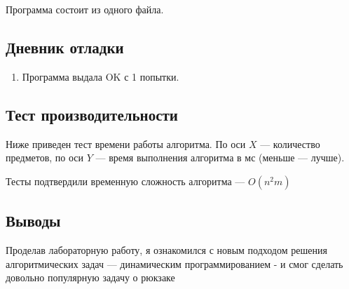 \documentclass[12pt]{article}
\begin{document}
Программа состоит из одного файла.


\newpage
\subsection*{Дневник отладки}

\begin{enumerate}
    \item Программа выдала {OK} с 1 попытки.
\end{enumerate}

\newpage
\subsection*{Тест производительности}

    Ниже приведен тест времени работы алгоритма. По оси $X$ — количество 
    предметов, по оси $Y$ — время выполнения алгоритма в мс (меньше — лучше).
    

    Тесты подтвердили временную сложность алгоритма — $O(n^2m)$



\newpage
\subsection*{Выводы}

Проделав лабораторную работу, я ознакомился с новым подходом решения 
алгоритмических задач — динамическим программированием - и смог сделать довольно популярную задачу о рюкзаке
\end{document}
